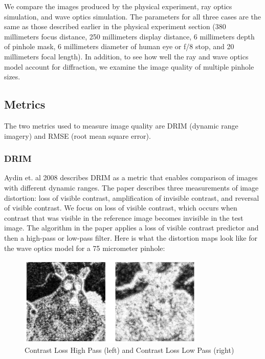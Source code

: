 \documentclass{acmsiggraph}
\begin{document}
We compare the images produced by the physical experiment, ray optics simulation, and wave optics simulation. The parameters for all three cases are the same as those described earlier in the physical experiment section (380 millimeters focus distance, 250 millimeters display distance, 6 millimeters depth of pinhole mask, 6 millimeters diameter of human eye or f/8 stop, and 20 millimeters focal length). In addition, to see how well the ray and wave optics model account for diffraction, we examine the image quality of multiple pinhole sizes.

\subsection{Metrics}

The two metrics used to measure image quality are DRIM (dynamic range imagery) and RMSE (root mean square error).

\subsubsection{DRIM}

Aydin et. al 2008 describes DRIM as a metric that enables comparison of images with different dynamic ranges. The paper describes three measurements of image distortion: loss of visible contrast, amplification of invisible contrast, and reversal of visible contrast. We focus on loss of visible contrast, which occurs when contrast that was visible in the reference image becomes invisible in the test image. The algorithm in the paper applies a loss of visible contrast predictor and then a high-pass or low-pass filter. Here is what the distortion maps look like for the wave optics model for a 75 micrometer pinhole:

\begin{figure}[ht]
  \centering
  \includegraphics[width=3.5in]{hp_lp_contrast_loss.png}
  \caption{Contrast Loss High Pass (left) and Contrast Loss Low Pass (right)}
  \label{fig:ferrari}
\end{figure}
\end{document}
